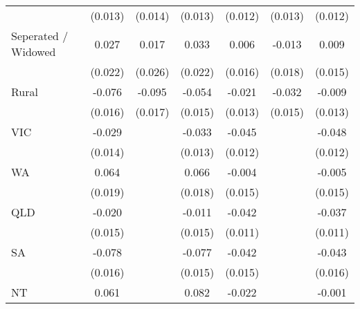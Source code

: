 {\begin{tabular}{l*{6}{c}}
                    &     (0.013)         &     (0.014)         &     (0.013)         &     (0.012)         &     (0.013)         &     (0.012)         \\
Seperated / Widowed &       0.027         &       0.017         &       0.033         &       0.006         &      -0.013         &       0.009         \\
                    &     (0.022)         &     (0.026)         &     (0.022)         &     (0.016)         &     (0.018)         &     (0.015)         \\
Rural               &      -0.076\sym{***}&      -0.095\sym{***}&      -0.054\sym{***}&      -0.021\sym{*}  &      -0.032\sym{**} &      -0.009         \\
                    &     (0.016)         &     (0.017)         &     (0.015)         &     (0.013)         &     (0.015)         &     (0.013)         \\
VIC                 &      -0.029\sym{**} &                     &      -0.033\sym{**} &      -0.045\sym{***}&                     &      -0.048\sym{***}\\
                    &     (0.014)         &                     &     (0.013)         &     (0.012)         &                     &     (0.012)         \\
WA                  &       0.064\sym{***}&                     &       0.066\sym{***}&      -0.004         &                     &      -0.005         \\
                    &     (0.019)         &                     &     (0.018)         &     (0.015)         &                     &     (0.015)         \\
QLD                 &      -0.020         &                     &      -0.011         &      -0.042\sym{***}&                     &      -0.037\sym{***}\\
                    &     (0.015)         &                     &     (0.015)         &     (0.011)         &                     &     (0.011)         \\
SA                  &      -0.078\sym{***}&                     &      -0.077\sym{***}&      -0.042\sym{***}&                     &      -0.043\sym{***}\\
                    &     (0.016)         &                     &     (0.015)         &     (0.015)         &                     &     (0.016)         \\
NT                  &       0.061         &                     &       0.082         &      -0.022         &                     &      -0.001         \\

\end{tabular}}
